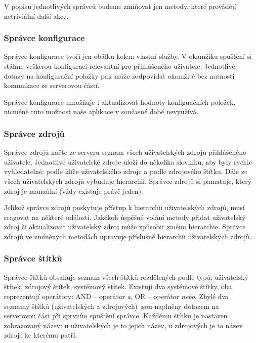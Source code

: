 V popisu jednotlivých správců budeme zmiňovat jen metody, které provádějí netriviální další akce.

\subsubsection{Správce konfigurace}

Správce konfigurace tvoří jen obálku kolem vlastní služby.
V okamžiku spuštění si stáhne veškerou konfiguraci relevantní pro přihlášeného uživatele.
Jednotlivé dotazy na konfigurační položky pak může zodpovídat okamžitě bez nutnosti komunikace se serverovou částí.

Správce konfigurace umožňuje i aktualizovat hodnoty konfiguačních položek, nicméně tuto možnost naše aplikace v současné době nevyužívá.

\subsubsection{Správce zdrojů}

Správce zdrojů načte ze serveru seznam všech uživatelských zdrojů přihlášeného uživatele.
Jednotlivé uživatelské zdroje uloží do několika slovníků, aby byly rychle vyhledatelné: podle klíče uživatelského zdroje a podle zdrojového štítku.
Dále ze všech uživatelských zdrojů vybuduje hierarchii.
Správce zdrojů si pamatuje, který zdroj je manuální (vždy existuje právě jeden).

Jelikož správce zdrojů poskytuje přístup k hierarchii uživatelských zdrojů, musí reagovat na některé události.
Jakékoli úspěšné volání metody přidat uživatelský zdroj či aktualizovat uživatelský zdroj může způsobit změnu hierarchie.
Správce zdrojů ve zmíněných metodách upravuje příslušně hierarchii uživatelských zdrojů.

\subsubsection{Správce štítků}

Správce štítků obsahuje seznam všech štítků rozdělených podle typů: uživatelský štítek, zdrojový štítek, systémový štítek.
Existují dva systémové štítky, oba reprezentují operátory: AND -- operátor \textit{a}, OR -- operátor \textit{nebo}.
Zbylé dva seznamy štítků (uživatelských a zdrojových) jsou naplněny dotazem na serverovou část při sprvním spuštění správce.
Každému štítku je nastaven zobrazovaný název: u uživatelských je to jejich název, u zdrojových je to název zdroje ke kterému patří.

